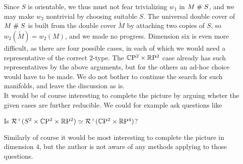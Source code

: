 Since $S$ is orientable, we thus must not fear trivializing $w_1$ in $M\mathrel\# S$, and we may make $w_2$ nontrivial by choosing suitable $S$.
The universal double cover of $M\mathrel\# S$ is built from the double cover $\widetilde{M}$ by attaching two copies of $S$, so $w_2(\widetilde{M}) = w_2(M)$, and we made no progress.
Dimension six is even more difficult, as there are four possible cases, in each of which we would need a representative of the correct $2$-type. 
The $\mathbb{C}\mathrm{P}^2\times\mathbb{R}\mathrm{P}^2$ case already has such representatives by the above arguments, but for the others an ad-hoc choice would have to be made.
We do not bother to continue the search for such manifolds, and leave the discussion as is.\\
It would be of course interesting to complete the picture by arguing wheter the given cases are further reducible.
We could for example ask questions like
\begin{q}
    Is $\mathcal{R}^+(S^2\times\mathbb{C}\mathrm{P}^2\times\mathbb{R}\mathrm{P}^2) \simeq \mathcal{R}^+(\mathbb{C}\mathrm{P}^2\times\mathbb{R}\mathrm{P}^4)$?
\end{q}\noindent{}
Similarly of course it would be most interesting to complete the picture in dimension $4$, but the author is not aware of any methods applying to those questions.
